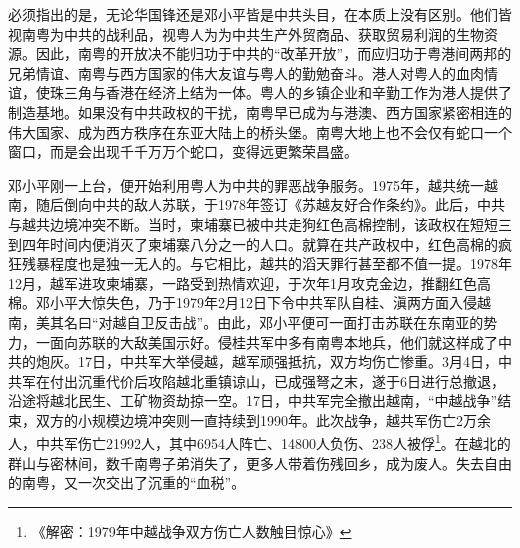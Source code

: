 必须指出的是，无论华国锋还是邓小平皆是中共头目，在本质上没有区别。他们皆视南粤为中共的战利品，视粤人为为中共生产外贸商品、获取贸易利润的生物资源。因此，南粤的开放决不能归功于中共的“改革开放”，而应归功于粤港间两邦的兄弟情谊、南粤与西方国家的伟大友谊与粤人的勤勉奋斗。港人对粤人的血肉情谊，使珠三角与香港在经济上结为一体。粤人的乡镇企业和辛勤工作为港人提供了制造基地。如果没有中共政权的干扰，南粤早已成为与港澳、西方国家紧密相连的伟大国家、成为西方秩序在东亚大陆上的桥头堡。南粤大地上也不会仅有蛇口一个窗口，而是会出现千千万万个蛇口，变得远更繁荣昌盛。

邓小平刚一上台，便开始利用粤人为中共的罪恶战争服务。1975年，越共统一越南，随后倒向中共的敌人苏联，于1978年签订《苏越友好合作条约》。此后，中共与越共边境冲突不断。当时，柬埔寨已被中共走狗红色高棉控制，该政权在短短三到四年时间内便消灭了柬埔寨八分之一的人口。就算在共产政权中，红色高棉的疯狂残暴程度也是独一无人的。与它相比，越共的滔天罪行甚至都不值一提。1978年12月，越军进攻柬埔寨，一路受到热情欢迎，于次年1月攻克金边，推翻红色高棉。邓小平大惊失色，乃于1979年2月12日下令中共军队自桂、滇两方面入侵越南，美其名曰“对越自卫反击战”。由此，邓小平便可一面打击苏联在东南亚的势力，一面向苏联的大敌美国示好。侵桂共军中多有南粤本地兵，他们就这样成了中共的炮灰。17日，中共军大举侵越，越军顽强抵抗，双方均伤亡惨重。3月4日，中共军在付出沉重代价后攻陷越北重镇谅山，已成强弩之末，遂于6日进行总撤退，沿途将越北民生、工矿物资劫掠一空。17日，中共军完全撤出越南，“中越战争”结束，双方的小规模边境冲突则一直持续到1990年。此次战争，越共军伤亡2万余人，中共军伤亡21992人，其中6954人阵亡、14800人负伤、238人被俘\footnote{《解密：1979年中越战争双方伤亡人数触目惊心》}。在越北的群山与密林间，数千南粤子弟消失了，更多人带着伤残回乡，成为废人。失去自由的南粤，又一次交出了沉重的“血税”。

